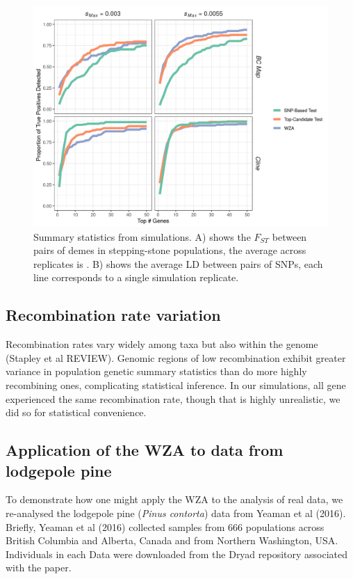\documentclass[11pt,twoside,lineno]{GSA_format}
\begin{document}
\begin{figure}
  \includegraphics[]{../SimulationStudy/directionalSelection/G.2.3/PowerPlot_sampledData.png}
  \caption{Summary statistics from simulations. A) shows the $F_{ST}$ between pairs of demes in stepping-stone populations, the average across replicates is . B) shows the average LD between pairs of SNPs, each line corresponds to a single simulation replicate.}

  \label{fig:lodgepole}
\end{figure}


\subsection{Recombination rate variation}

Recombination rates vary widely among taxa but also within the genome (Stapley et al REVIEW). Genomic regions of low recombination exhibit greater variance in population genetic summary statistics than do more highly recombining ones, complicating statistical inference. In our simulations, all gene experienced the same recombination rate, though that is highly unrealistic, we did so for statistical convenience. 
\subsection{Application of the WZA to data from lodgepole pine}

To demonstrate how one might apply the WZA to the analysis of real data, we re-analysed the lodgepole pine (\textit{Pinus contorta}) data from Yeaman et al (2016). Briefly, Yeaman et al (2016) collected samples from 666 populations across British Columbia and Alberta, Canada and from Northern Washington, USA. Individuals in each 
Data were downloaded from the Dryad repository associated with the paper. 
\end{document}
